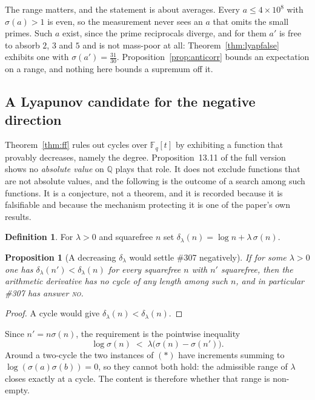 \documentclass[11pt]{article}
\newtheorem{proposition}[theorem]{Proposition}
\theoremstyle{definition}
\newtheorem{definition}[theorem]{Definition}
\begin{document}
The range matters, and the statement is about averages. Every $a\le4\times10^8$ with $\sigma(a)>1$
is even, so the measurement never sees an $a$ that omits the small primes. Such $a$ exist, since the
prime reciprocals diverge, and for them $a'$ is free to absorb $2$, $3$ and $5$ and is not mass-poor
at all: Theorem~\ref{thm:lyapfalse} exhibits one with $\sigma(a')=\tfrac{31}{30}$. Proposition~\ref{prop:anticorr}
bounds an expectation on a range, and nothing here bounds a supremum off it.

\subsection*{A Lyapunov candidate for the negative direction}

Theorem~\ref{thm:ff} rules out cycles over $\mathbb{F}_q[t]$ by exhibiting a function that provably
decreases, namely the degree. Proposition~13.11 of the full version shows no \emph{absolute value} on
$\mathbb{Q}$ plays that role. It does not exclude functions that are not absolute values, and the
following is the outcome of a search among such functions. It is a conjecture, not a theorem, and it
is recorded because it is falsifiable and because the mechanism protecting it is one of the paper's
own results.

\begin{definition}\label{def:lyap}
For $\lambda>0$ and squarefree $n$ set $\delta_\lambda(n)=\log n+\lambda\,\sigma(n)$.
\end{definition}

\begin{proposition}[A decreasing $\delta_\lambda$ would settle \#307 negatively]\label{prop:lyapworks}
If for some $\lambda>0$ one has $\delta_\lambda(n')<\delta_\lambda(n)$ for every squarefree $n$ with
$n'$ squarefree, then the arithmetic derivative has no cycle of any length among such $n$, and in
particular \#307 has answer \textsc{no}.
\end{proposition}
\begin{proof}
A cycle would give $\delta_\lambda(n)<\delta_\lambda(n)$.
\end{proof}

Since $n'=n\sigma(n)$, the requirement is the pointwise inequality
\[ \log\sigma(n)\;<\;\lambda\bigl(\sigma(n)-\sigma(n')\bigr). \tag{$\ast$} \]
Around a two-cycle the two instances of $(\ast)$ have increments summing to
$\log(\sigma(a)\sigma(b))=0$, so they cannot both hold: the admissible range of $\lambda$ closes
exactly at a cycle. The content is therefore whether that range is non-empty.
\end{document}
